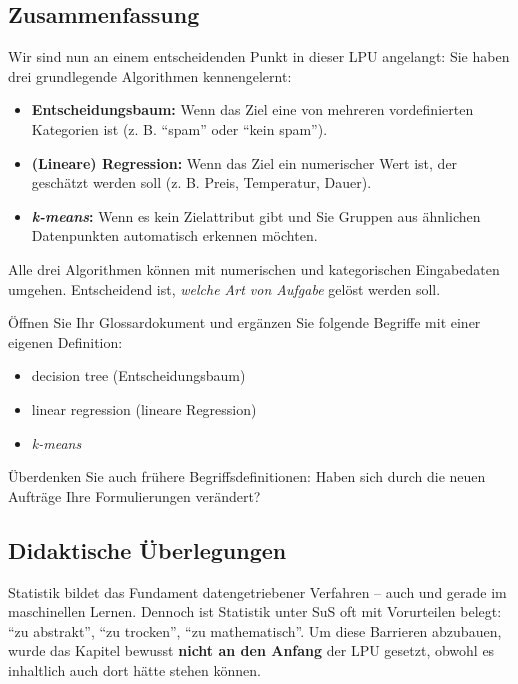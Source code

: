 \begin{lpu}
\subsection*{Zusammenfassung}
Wir sind nun an einem entscheidenden Punkt in dieser LPU angelangt: Sie haben drei grundlegende Algorithmen kennengelernt:

\begin{itemize}
  \item \textbf{Entscheidungsbaum:} Wenn das Ziel eine von mehreren vordefinierten Kategorien ist (z. B. ``spam'' oder ``kein spam'').
  \item \textbf{(Lineare) Regression:} Wenn das Ziel ein numerischer Wert ist, der geschätzt werden soll (z. B. Preis, Temperatur, Dauer).
  \item \textbf{\textit{k-means}:} Wenn es kein Zielattribut gibt und Sie Gruppen aus ähnlichen Datenpunkten automatisch erkennen möchten.
\end{itemize}

Alle drei Algorithmen können mit numerischen und kategorischen Eingabedaten umgehen. Entscheidend ist, \emph{welche Art von Aufgabe} gelöst werden soll.

\begin{aufgabe}{6}
Öffnen Sie Ihr Glossardokument und ergänzen Sie folgende Begriffe mit einer eigenen Definition:

\begin{itemize}
  \item decision tree (Entscheidungsbaum)
  \item linear regression (lineare Regression)
  \item \textit{k-means}
\end{itemize}

Überdenken Sie auch frühere Begriffsdefinitionen: Haben sich durch die neuen Aufträge Ihre Formulierungen verändert?
\end{aufgabe}
\end{lpu}


\subsection*{Didaktische Überlegungen}

Statistik bildet das Fundament datengetriebener Verfahren – auch und gerade im maschinellen Lernen. Dennoch ist Statistik unter SuS oft mit Vorurteilen belegt: ``zu abstrakt'', ``zu trocken'', ``zu mathematisch''. Um diese Barrieren abzubauen, wurde das Kapitel bewusst \textbf{nicht an den Anfang} der LPU gesetzt, obwohl es inhaltlich auch dort hätte stehen können.

